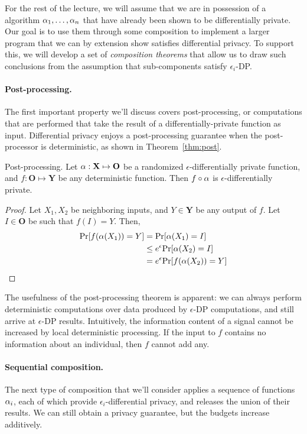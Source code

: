 \documentclass[11pt,twoside]{scrartcl}
\begin{document}
For the rest of the lecture, we will assume that we are in possession of a algorithm $\alpha_1, \ldots, \alpha_n$ that have already been shown to be differentially private. Our goal is to use them through some composition to implement a larger program that we can by extension show satisfies differential privacy. To support this, we will develop a set of \emph{composition theorems} that allow us to draw such conclusions from the assumption that sub-components satisfy $\epsilon_i$-DP.

\paragraph{Post-processing.} The first important property we'll discuss covers post-processing, or computations that are performed that take the result of a differentially-private function as input. Differential privacy enjoys a post-processing guarantee when the post-processor is deterministic, as shown in Theorem~\ref{thm:post}.

\begin{theorem}{Post-processing.}
\label{thm:post}
Let $\alpha : \mathbf{X} \mapsto \mathbf{O}$ be a randomized $\epsilon$-differentially private function, and $f : \mathbf{O} \mapsto \mathbf{Y}$ be any deterministic function. Then $f \circ \alpha$ is $\epsilon$-differentially private.
\end{theorem}

\begin{proof}
Let $X_1, X_2$ be neighboring inputs, and $Y \in \mathbf{Y}$ be any output of $f$. Let $I \in \mathbf{O}$ be such that $f(I) = Y$. Then,
\begin{align*}
\mathrm{Pr}[f(\alpha(X_1)) = Y] &= \mathrm{Pr}[\alpha(X_1) = I] \\
&\le e^\epsilon\mathrm{Pr}[\alpha(X_2) = I] \\
&= e^\epsilon\mathrm{Pr}[f(\alpha(X_2)) = Y]
\end{align*}
\end{proof}

The usefulness of the post-processing theorem is apparent: we can always perform deterministic computations over data produced by $\epsilon$-DP computations, and still arrive at $\epsilon$-DP results. Intuitively, the information content of a signal cannot be increased by local deterministic processing. If the input to $f$ contains no information about an individual, then $f$ cannot add any.

\paragraph{Sequential composition.} The next type of composition that we'll consider applies a sequence of functions $\alpha_i$, each of which provide $\epsilon_i$-differential privacy, and releases the union of their results. We can still obtain a privacy guarantee, but the budgets increase additively.
\end{document}

